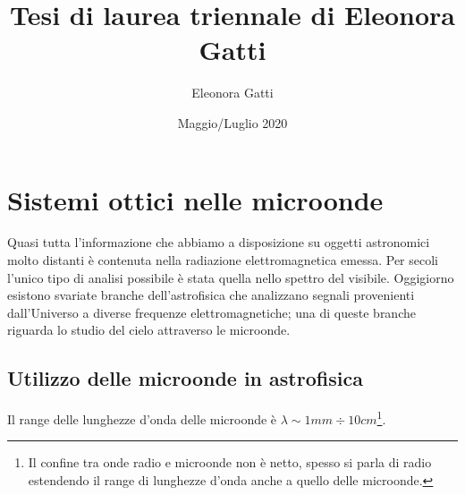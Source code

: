 \documentclass[12pt,a4paper,final]{book}
\title{Tesi di laurea triennale di Eleonora Gatti}
\author{Eleonora Gatti}
\date{Maggio/Luglio 2020}
\begin{document}


\newpage
\thispagestyle{empty}
\clearpage\mbox{}\clearpage
\newpage
\thispagestyle{empty}


\tableofcontents
\newpage


\chapter{Sistemi ottici nelle microonde}\label{intro_sistemi_ottici}
Quasi tutta l'informazione che abbiamo a disposizione su oggetti astronomici molto distanti è contenuta nella radiazione elettromagnetica emessa. Per secoli l'unico tipo di analisi possibile è stata quella nello spettro del visibile. Oggigiorno esistono svariate branche dell'astrofisica che analizzano segnali provenienti dall'Universo a diverse frequenze elettromagnetiche; una di queste branche riguarda lo studio del cielo attraverso le microonde. 


\section{Utilizzo delle microonde in astrofisica}\label{microonde_astrofisica}
Il range delle lunghezze d'onda delle microonde è $\lambda \sim 1 \unit{mm} \div 10 \unit{cm}$\footnote{Il confine tra onde radio e microonde non è netto, spesso si parla di radio estendendo il range di lunghezze d'onda anche a quello delle microonde.}.
\end{document}
